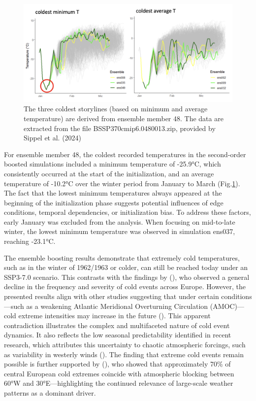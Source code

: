 \documentclass[
]{krantz}
\begin{document}
\begin{figure}

{\centering \includegraphics[width=0.9\linewidth]{work/03-coldex/figures/boosting_results48} 

}

\caption{The three coldest storylines (based on minimum and average temperature) are derived from ensemble member 48. The data are extracted from the file BSSP370cmip6.0480013.zip, provided by Sippel et al. (2024)}\label{fig:boosting-result48}
\end{figure}

For ensemble member 48, the coldest recorded temperatures in the second-order boosted simulations included a minimum temperature of -25.9°C, which consistently occurred at the start of the initialization, and an average temperature of -10.2°C over the winter period from January to March (Fig.\ref{fig:boosting-result48}). The fact that the lowest minimum temperatures always appeared at the beginning of the initialization phase suggests potential influences of edge conditions, temporal dependencies, or initialization bias. To address these factors, early January was excluded from the analysis. When focusing on mid-to-late winter, the lowest minimum temperature was observed in simulation ens037, reaching -23.1°C.

The ensemble boosting results demonstrate that extremely cold temperatures, such as in the winter of 1962/1963 or colder, can still be reached today under an SSP3-7.0 scenario. This contrasts with the findings by (\citet{quesada2023}), who observed a general decline in the frequency and severity of cold events across Europe. However, the presented results align with other studies suggesting that under certain conditions---such as a weakening Atlantic Meridional Overturning Circulation (AMOC)---cold extreme intensities may increase in the future (\citet{meccia2023}). This apparent contradiction illustrates the complex and multifaceted nature of cold event dynamics. It also reflects the low seasonal predictability identified in recent research, which attributes this uncertainty to chaotic atmospheric forcings, such as variability in westerly winds (\citet{kautz2021}). The finding that extreme cold events remain possible is further supported by (\citet{brunner2018}), who showed that approximately 70\% of central European cold extremes coincide with atmospheric blocking between 60°W and 30°E---highlighting the continued relevance of large-scale weather patterns as a dominant driver.
\end{document}
